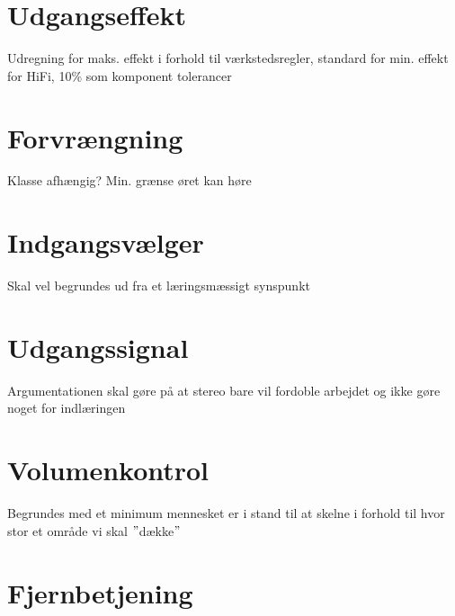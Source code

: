 \section{Udgangseffekt}
\label{krav_udgangseffekt}
Udregning for maks. effekt i forhold til værkstedsregler, standard for min. effekt for HiFi, 10\% som komponent tolerancer

\section{Forvrængning}
\label{krav_forvraengning}
Klasse afhængig? Min. grænse øret kan høre

\section{Indgangsvælger}
\label{krav_indgangsvaelger}
Skal vel begrundes ud fra et læringsmæssigt synspunkt

\section{Udgangssignal}
\label{krav_udgangssignal}
Argumentationen skal gøre på at stereo bare vil fordoble arbejdet og ikke gøre noget for indlæringen

\section{Volumenkontrol}
\label{krav_volumenkontrol}
Begrundes med et minimum mennesket er i stand til at skelne i forhold til hvor stor et område vi skal $"$dække$"$

\section{Fjernbetjening}
\label{krav_fjernbetjening}
